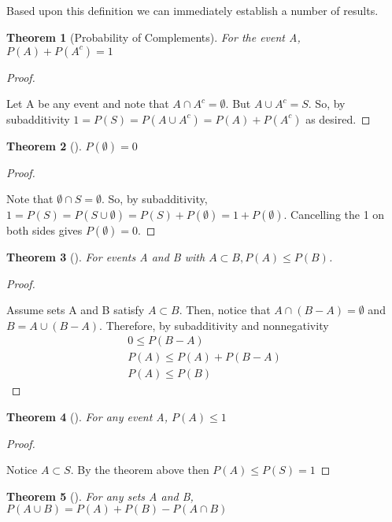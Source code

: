 \documentclass[10pt,]{book}
\theoremstyle{plain}
\newtheorem{theorem}{Theorem}[section]
\theoremstyle{definition}
\theoremstyle{definition}
\numberwithin{equation}{section}
\begin{document}
\subsection[]{}\label{BasicProbabilityTheorems}
Based upon this definition we can immediately establish a number of results.%
\begin{theorem}[Probability of Complements]\label{ProbabilityComplemnts}
 For the event A, \(P(A) + P(A^c) = 1\)\end{theorem}
\begin{proof}\hypertarget{proof-4}{}
Let A be any event and note that \(A \cap A^c = \emptyset\).  But \(A \cup A^c = S\).
			So, by subadditivity \(1 = P(S) = P(A \cup A^c) = P(A) + P(A^c)\) as desired.%
\end{proof}
\begin{theorem}[]\label{ProbabilityEmptySet}
\(P(\emptyset) = 0\)\end{theorem}
\begin{proof}\hypertarget{proof-5}{}
Note that \(\emptyset \cap S = \emptyset\). So, by subadditivity, 
			\(1 = P(S) = P(S \cup \emptyset) = P(S) + P(\emptyset) = 1 + P(\emptyset)\).
			Cancelling the 1 on both sides gives \(P(\emptyset) = 0\). %
\end{proof}
\begin{theorem}[]\label{ProbabilityContainment}
For events A and B with \( A \subset B, P(A) \le P(B)\).
		\end{theorem}
\begin{proof}\hypertarget{proof-6}{}
Assume sets A and B satisfy \( A \subset B\). Then, notice that
			\(A \cap (B-A) = \emptyset\) and  \(B = A \cup (B-A)\). Therefore, by 
			subadditivity and nonnegativity%
\begin{gather*}
0 \le P(B-A)\\
P(A) \le P(A) + P(B-A) \\
P(A) \le P(B)
\end{gather*}\end{proof}
\begin{theorem}[]\label{ProbabilityLessThanOne}
For any event A, \(P(A) \le 1\)\end{theorem}
\begin{proof}\hypertarget{proof-7}{}
Notice \(A \subset S\). By the theorem above then \( P(A) \le P(S) = 1\)%
\end{proof}
\begin{theorem}[]\label{ProbabilityTwoUnions}
For any sets A and B, \(P(A \cup B) = P(A) + P(B) - P(A \cap B)\)\end{theorem}
\end{document}
